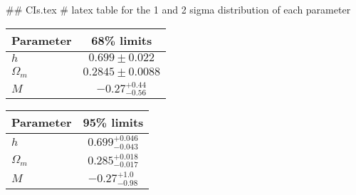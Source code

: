 ## CIs.tex
# latex table for the 1 and 2 sigma distribution of each parameter

\begin{tabular} { l  c}
 Parameter &  68\% limits\\
\hline
{\boldmath$h              $} & $0.699\pm 0.022            $\\
{\boldmath$\Omega_m       $} & $0.2845\pm 0.0088          $\\
{\boldmath$M              $} & $-0.27^{+0.44}_{-0.56}     $\\
\hline
\end{tabular}

\begin{tabular} { l  c}
 Parameter &  95\% limits\\
\hline
{\boldmath$h              $} & $0.699^{+0.046}_{-0.043}   $\\
{\boldmath$\Omega_m       $} & $0.285^{+0.018}_{-0.017}   $\\
{\boldmath$M              $} & $-0.27^{+1.0}_{-0.98}      $\\
\hline
\end{tabular}
